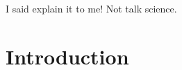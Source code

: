 



\begin{savequote}[50mm]
I said explain it to me! Not talk science.
\end{savequote}

\chapter{Introduction}
\label{cha:introduction}

\ifpdf
    \graphicspath{{1_introduction/figures/PNG/}{1_introduction/figures/PDF/}{1_introduction/figures/}}
\else
    \graphicspath{{1_introduction/figures/EPS/}{1_introduction/figures/}}
\fi







